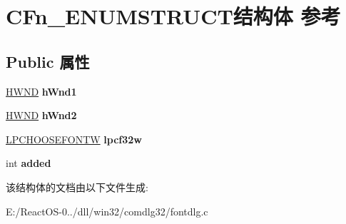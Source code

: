 \hypertarget{struct_c_fn___e_n_u_m_s_t_r_u_c_t}{}\section{C\+Fn\+\_\+\+E\+N\+U\+M\+S\+T\+R\+U\+C\+T结构体 参考}
\label{struct_c_fn___e_n_u_m_s_t_r_u_c_t}
\subsection*{Public 属性}
\begin{DoxyCompactItemize}
\item 
\mbox{\label{struct_c_fn___e_n_u_m_s_t_r_u_c_t_a1289c39781eaa5a2a52de07498235654}} 
\hyperlink{interfacevoid}{H\+W\+ND} {\bfseries h\+Wnd1}
\item 
\mbox{\label{struct_c_fn___e_n_u_m_s_t_r_u_c_t_a7fd9347b16c8a655d1431c1529baaa0d}} 
\hyperlink{interfacevoid}{H\+W\+ND} {\bfseries h\+Wnd2}
\item 
\mbox{\label{struct_c_fn___e_n_u_m_s_t_r_u_c_t_abe4e4387614af00ccc86cdc372d34ace}} 
\hyperlink{structtag_c_h_o_o_s_e_f_o_n_t_w}{L\+P\+C\+H\+O\+O\+S\+E\+F\+O\+N\+TW} {\bfseries lpcf32w}
\item 
\mbox{\label{struct_c_fn___e_n_u_m_s_t_r_u_c_t_a08912a5c7b4a27be097d8fac4f5a1940}} 
int {\bfseries added}
\end{DoxyCompactItemize}


该结构体的文档由以下文件生成\+:\begin{DoxyCompactItemize}
\item 
E\+:/\+React\+O\+S-\/0../dll/win32/comdlg32/fontdlg.\+c\end{DoxyCompactItemize}
